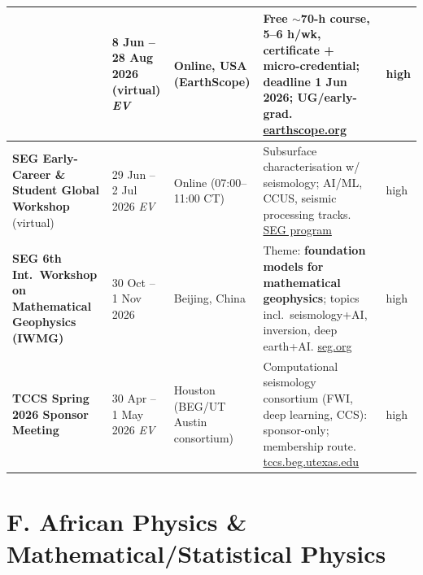 \documentclass[11pt,a4paper]{article}
\newcommand{\ev}{\emph{EV}}
\begin{document}
\begin{longtable}{@{}p{3.2cm}p{3.0cm}p{2.5cm}p{5.2cm}p{1.6cm}@{}}
  & 8 Jun -- 28 Aug 2026 (virtual) \ev{}
  & Online, USA (EarthScope)
  & \textbf{Free} $\sim$70-h course, 5--6 h/wk, certificate + micro-credential; \textbf{deadline 1 Jun 2026}; UG/early-grad. \href{https://www.earthscope.org/event/2026-seismology-skill-building-workshop-ssbw/}{earthscope.org}
  & high \\
\midrule
\textbf{SEG Early-Career \& Student Global Workshop} (virtual)
  & 29 Jun -- 2 Jul 2026 \ev{}
  & Online (07:00--11:00 CT)
  & Subsurface characterisation w/ seismology; AI/ML, CCUS, seismic processing tracks. \href{https://seg.org/wp-content/uploads/2026/05/SEG_EC_Workshop_Technical_Program_R1.pdf}{SEG program}
  & high \\
\midrule
\textbf{SEG 6th Int.\ Workshop on Mathematical Geophysics (IWMG)}
  & 30 Oct -- 1 Nov 2026
  & Beijing, China
  & Theme: \textbf{foundation models for mathematical geophysics}; topics incl.\ seismology+AI, inversion, deep earth+AI. \href{https://seg.org/calendar_events/2026-seg-6th-international-workshop-on-mathematical-geophysics/}{seg.org}
  & high \\
\midrule
\textbf{TCCS Spring 2026 Sponsor Meeting}
  & 30 Apr -- 1 May 2026 \ev{}
  & Houston (BEG/UT Austin consortium)
  & Computational seismology consortium (FWI, deep learning, CCS): sponsor-only; membership route. \href{https://tccs.beg.utexas.edu/}{tccs.beg.utexas.edu}
  & high \\
\bottomrule
\end{longtable}

\section{F. African Physics \& Mathematical/Statistical Physics}
\end{document}
